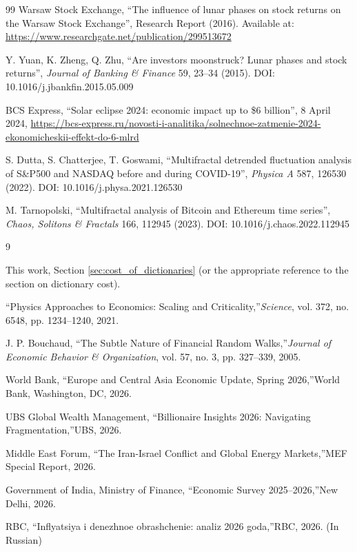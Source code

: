 \documentclass[11pt,a4paper]{article}
\theoremstyle{remark}
\begin{document}
\begin{thebibliography}{99}
		Warsaw Stock Exchange, ``The influence of lunar phases on stock returns on the Warsaw Stock Exchange'', Research Report (2016). Available at: \url{https://www.researchgate.net/publication/299513672}
		
		Y. Yuan, K. Zheng, Q. Zhu, ``Are investors moonstruck? Lunar phases and stock returns'', \emph{Journal of Banking \& Finance} 59, 23–34 (2015). DOI: 10.1016/j.jbankfin.2015.05.009
		
		BCS Express, ``Solar eclipse 2024: economic impact up to \$6 billion'', 8 April 2024, \url{https://bcs-express.ru/novosti-i-analitika/solnechnoe-zatmenie-2024-ekonomicheskii-effekt-do-6-mlrd}
		
		S. Dutta, S. Chatterjee, T. Goswami, ``Multifractal detrended fluctuation analysis of S\&P500 and NASDAQ before and during COVID-19'', \emph{Physica A} 587, 126530 (2022). DOI: 10.1016/j.physa.2021.126530
		
		M. Tarnopolski, ``Multifractal analysis of Bitcoin and Ethereum time series'', \emph{Chaos, Solitons \& Fractals} 166, 112945 (2023). DOI: 10.1016/j.chaos.2022.112945
		
		\begin{thebibliography}{9}
			
			This work, Section \ref{sec:cost_of_dictionaries} (or the appropriate reference to the section on dictionary cost).
			
			\textquotedblleft Physics Approaches to Economics: Scaling and Criticality,\textquotedblright \emph{Science}, vol. 372, no. 6548, pp. 1234--1240, 2021.
			
			J. P. Bouchaud, \textquotedblleft The Subtle Nature of Financial Random Walks,\textquotedblright \emph{Journal of Economic Behavior \& Organization}, vol. 57, no. 3, pp. 327--339, 2005.
			
			World Bank, \textquotedblleft Europe and Central Asia Economic Update, Spring 2026,\textquotedblright World Bank, Washington, DC, 2026.
			
			UBS Global Wealth Management, \textquotedblleft Billionaire Insights 2026: Navigating Fragmentation,\textquotedblright UBS, 2026.
			
			Middle East Forum, \textquotedblleft The Iran-Israel Conflict and Global Energy Markets,\textquotedblright MEF Special Report, 2026.
			
			Government of India, Ministry of Finance, \textquotedblleft Economic Survey 2025--2026,\textquotedblright New Delhi, 2026.
			
			RBC, \textquotedblleft Inflyatsiya i denezhnoe obrashchenie: analiz 2026 goda,\textquotedblright RBC, 2026. (In Russian)
			
		\end{thebibliography}
		
	\end{thebibliography}
	
\end{document}
